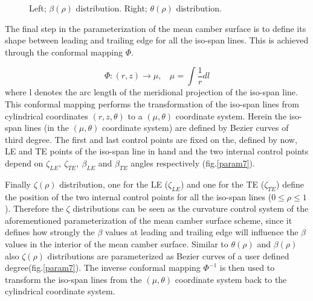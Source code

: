 \begin{figure}[h!]
\begin{minipage}[b]{1\linewidth}
 \centering
\end{minipage}
\caption{Left; $\beta(\rho)$ distribution. Right; $\theta(\rho)$ distribution.}
\label{param4}
\end{figure}

The final step in the parameterization of the mean camber surface is to define its shape between leading and trailing edge for all the iso-span lines. This is achieved through the conformal mapping $\Phi$.


\begin{equation} 
   \Phi:(r,z)\rightarrow \mu, ~~~~\mu=\int{\frac{1}{r}dl}
   \label{phi1} 
\end{equation}
where l denotes the arc length of the meridional projection of the iso-span line. This conformal mapping performs the transformation of the iso-span lines from cylindrical coordinates $(r,z,\theta)$ to a $(\mu,\theta)$ coordinate system. Herein the iso-span lines (in the $(\mu,\theta)$ coordinate system) are defined by Bezier curves of third degree. The first and last control points are fixed on the, defined by now, LE and TE points of the iso-span line in hand and the two internal control points depend on $\zeta_{LE}, ~\zeta_{TE}, ~\beta_{LE}$ and $\beta_{TE}$ angles respectively (fig.\ref{param7}).
  
Finally $\zeta(\rho)$ distribution, one for the LE ($\zeta_{LE}$) and one for the TE ($\zeta_{TE}$) define the position of the two internal control points for all the iso-span lines ($0\leq\rho\leq1$). Therefore the $\zeta$ distributions can be seen as the curvature control system of the aforementioned parameterization of the mean camber surface scheme, since it defines how strongly the $\beta$ values at leading and trailing edge will influence the $\beta$ values in the interior of the mean camber surface. Similar to $\theta(\rho)$ and $\beta(\rho)$ also $\zeta(\rho)$ distributions are parameterized as Bezier curves of a user defined degree(fig.\ref{param7}). The inverse conformal mapping $\Phi^{-1}$ is then used to transform the iso-span lines from the $(\mu,\theta)$ coordinate system back to the cylindrical coordinate system. 

